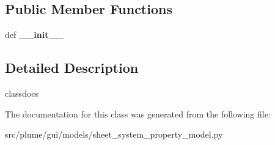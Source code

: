 \subsection*{Public Member Functions}
\begin{DoxyCompactItemize}
\item 
def {\bfseries \+\_\+\+\_\+init\+\_\+\+\_\+}\hypertarget{classplume-creator_1_1src_1_1plume_1_1gui_1_1models_1_1sheet__system__property__model_1_1_sheet_system_property_model_a6dfd6213140147bb3d462841528ef565}{}\label{classplume-creator_1_1src_1_1plume_1_1gui_1_1models_1_1sheet__system__property__model_1_1_sheet_system_property_model_a6dfd6213140147bb3d462841528ef565}

\end{DoxyCompactItemize}


\subsection{Detailed Description}
classdocs 

The documentation for this class was generated from the following file\+:\begin{DoxyCompactItemize}
\item 
src/plume/gui/models/sheet\+\_\+system\+\_\+property\+\_\+model.\+py\end{DoxyCompactItemize}
